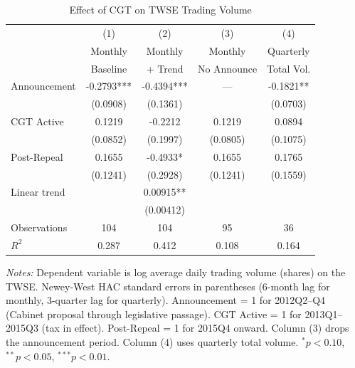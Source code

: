 \begin{table}[htbp]
\centering
\caption{Effect of CGT on TWSE Trading Volume}
\label{tab:main_did}
\begin{threeparttable}
\small
\begin{tabular}{lcccc}
\toprule
 & (1) & (2) & (3) & (4) \\
 & Monthly & Monthly & Monthly & Quarterly \\
 & Baseline & + Trend & No Announce & Total Vol. \\
\midrule
Announcement & -0.2793*** & -0.4394*** & --- & -0.1821** \\
 & (0.0908) & (0.1361) & & (0.0703) \\[4pt]
CGT Active & 0.1219 & -0.2212 & 0.1219 & 0.0894 \\
 & (0.0852) & (0.1997) & (0.0805) & (0.1075) \\[4pt]
Post-Repeal & 0.1655 & -0.4933* & 0.1655 & 0.1765 \\
 & (0.1241) & (0.2928) & (0.1241) & (0.1559) \\[4pt]
Linear trend & & 0.00915** & & \\
 & & (0.00412) & & \\
\midrule
Observations & 104 & 104 & 95 & 36 \\
$R^2$ & 0.287 & 0.412 & 0.108 & 0.164 \\
\bottomrule
\end{tabular}
\begin{tablenotes}[flushleft]\footnotesize
\item \textit{Notes:} Dependent variable is log average daily trading volume (shares) on the TWSE. Newey-West HAC standard errors in parentheses (6-month lag for monthly, 3-quarter lag for quarterly). Announcement = 1 for 2012Q2--Q4 (Cabinet proposal through legislative passage). CGT Active = 1 for 2013Q1--2015Q3 (tax in effect). Post-Repeal = 1 for 2015Q4 onward. Column (3) drops the announcement period. Column (4) uses quarterly total volume. $^{*}p<0.10$, $^{**}p<0.05$, $^{***}p<0.01$.
\end{tablenotes}
\end{threeparttable}
\end{table}
